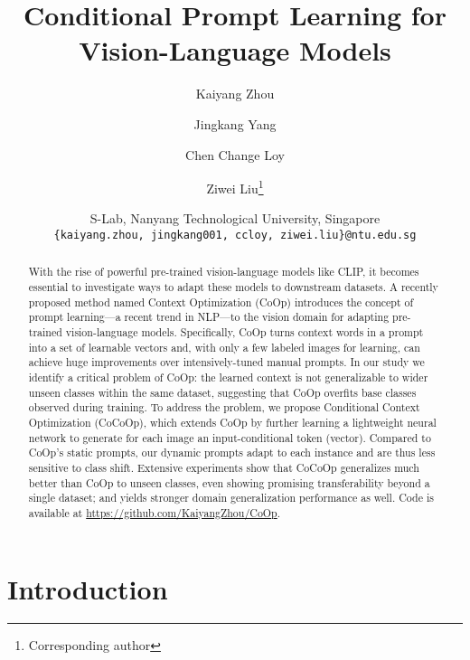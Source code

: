 \documentclass[10pt,twocolumn,letterpaper]{article}
\begin{document}
\title{Conditional Prompt Learning for Vision-Language Models}

\author{
Kaiyang Zhou \and
Jingkang Yang \and
Chen Change Loy \and
Ziwei Liu\thanks{Corresponding author}
\and
S-Lab, Nanyang Technological University, Singapore \\
{\tt\small \{kaiyang.zhou, jingkang001, ccloy, ziwei.liu\}@ntu.edu.sg}
}
\maketitle



\begin{abstract}
With the rise of powerful pre-trained vision-language models like CLIP, it becomes essential to investigate ways to adapt these models to downstream datasets. A recently proposed method named Context Optimization (CoOp) introduces the concept of prompt learning---a recent trend in NLP---to the vision domain for adapting pre-trained vision-language models. Specifically, CoOp turns context words in a prompt into a set of learnable vectors and, with only a few labeled images for learning, can achieve huge improvements over intensively-tuned manual prompts. In our study we identify a critical problem of CoOp: the learned context is not generalizable to wider unseen classes within the same dataset, suggesting that CoOp overfits base classes observed during training. To address the problem, we propose Conditional Context Optimization (CoCoOp), which extends CoOp by further learning a lightweight neural network to generate for each image an input-conditional token (vector). Compared to CoOp's static prompts, our dynamic prompts adapt to each instance and are thus less sensitive to class shift. Extensive experiments show that CoCoOp generalizes much better than CoOp to unseen classes, even showing promising transferability beyond a single dataset; and yields stronger domain generalization performance as well. Code is available at \url{https://github.com/KaiyangZhou/CoOp}.
\end{abstract}




\section{Introduction}
\label{sec:intro}
\end{document}
